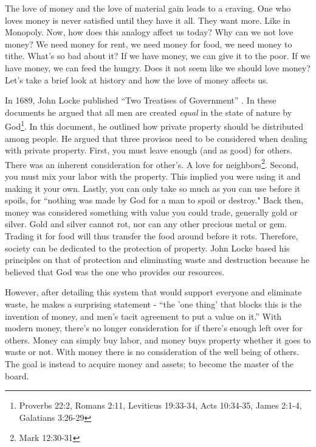 \documentclass[11pt]{article}
\begin{document}
\begin{multicols}{2}
The love of money and the love of material gain leads to a craving. One who loves money is never satisfied until they have it all. They want more. Like in Monopoly. Now, how does this analogy affect us today? Why can we not love money? We need money for rent, we need money for food, we need money to tithe. What’s so bad about it? If we have money, we can give it to the poor. If we have money, we can feed the hungry. Does it not seem like we should love money? Let’s take a brief look at history and how the love of money affects us.

In 1689, John Locke published ``Two Treatises of Government” \cite{TwoTreatises}. In these documents he argued that all men are created \textit{equal} in the state of nature by God\footnote{Proverbs 22:2, Romans 2:11, Leviticus 19:33-34, Acts 10:34-35, James 2:1-4, Galatians 3:26-29}. In this document, he outlined how private property should be distributed among people. He argued that three provisos need to be considered when dealing with private property. First, you must leave enough (and as good) for others. There was an inherent consideration for other's. A love for neighbors\footnote{Mark 12:30-31}. Second, you must mix your labor with the property. This implied you were using it and making it your own. Lastly, you can only take so much as you can use before it spoils, for ``nothing was made by God for a man to spoil or destroy." Back then, money was considered something with value you could trade, generally gold or silver. Gold and silver cannot rot, nor can any other precious metal or gem. Trading it for food will thus transfer the food around before it rots. Therefore, society can be dedicated to the protection of property. John Locke based his principles on that of protection and eliminating waste and destruction because he believed that God was the one who provides our resources.

However, after detailing this system that would support everyone and eliminate waste, he makes a surprising statement - ``the 'one thing' that blocks this is the invention of money, and men's tacit agreement to put a value on it.” With modern money, there's no longer consideration for if there's enough left over for others. Money can simply buy labor, and money buys property whether it goes to waste or not. With money there is no consideration of the well being of others. The goal is instead to acquire money and assets; to become the master of the board.


\end{multicols}
\end{document}
